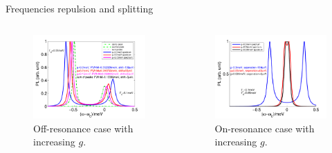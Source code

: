 \documentclass{beamer}
\begin{document}
\begin{frame}{Frequencies repulsion and splitting}
\begin{columns}
\begin{figure}[H]
\centering
\begin{center}
\includegraphics[width=1.1\textwidth]{./Figs/gincreased1}
\end{center}
\caption[Spec of off-resonance cavity.]{Off-resonance case with increasing $ g $.}
\label{gincrease1}
\end{figure}

\begin{figure}[H]
\centering
\begin{center}
\includegraphics[width=1.1\textwidth]{./Figs/gincreased_onresonance}
\end{center}
\caption[Spec with an on-resonance dipole.]{On-resonance case with increasing $ g $.}
\label{gincrease2}
\end{figure}
\end{columns}
\end{frame}
\end{document}
